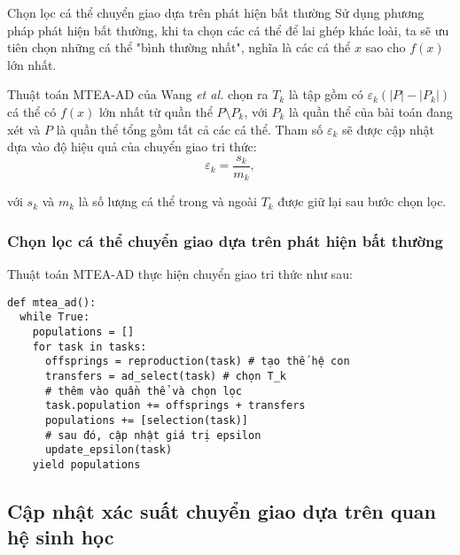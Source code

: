 \begin{frame}{Chọn lọc cá thể chuyển giao dựa trên phát hiện bất thường}
Sử dụng phương pháp phát hiện bất thường, khi ta chọn các cá thể để lai ghép
khác loài, ta sẽ ưu tiên chọn những cá thể "bình thường nhất", nghĩa là các cá
thể \( x \) sao cho \( f(x) \) lớn nhất.

Thuật toán MTEA-AD của Wang \textit{et al.} chọn ra \( T_{k} \) là tập gồm có \(
\varepsilon_{k} (|P| - |P_{k}|) \) cá thể
có \( f(x) \) lớn nhất từ quần thể \( P \setminus P_{k} \), với \( P_{k} \) là
quần thể của bài toán đang xét và \( P \) là quần thể tổng gồm tất cả các cá
thể. Tham số \( \varepsilon_{k} \) sẽ được cập nhật dựa vào độ hiệu quả của chuyển
giao tri thức:
\[
  \varepsilon_{k} = \frac{s_{k}}{m_{k}}
,\]

với \( s_{k} \) và \( m_{k} \) là số lượng cá thể trong và ngoài \( T_{k} \)
được giữ lại sau bước chọn lọc.
\end{frame}

\begin{frame}[fragile]
\frametitle{Chọn lọc cá thể chuyển giao dựa trên phát hiện bất thường}
  Thuật toán MTEA-AD thực hiện chuyển giao tri thức như sau:
\begin{verbatim}
def mtea_ad():
  while True:
    populations = []
    for task in tasks:
      offsprings = reproduction(task) # tạo thế hệ con
      transfers = ad_select(task) # chọn T_k
      # thêm vào quần thể và chọn lọc
      task.population += offsprings + transfers 
      populations += [selection(task)]
      # sau đó, cập nhật giá trị epsilon
      update_epsilon(task)
    yield populations
\end{verbatim}
\end{frame}


\subsection{Cập nhật xác suất chuyển giao dựa trên quan hệ sinh học} %
\label{sub:Cập nhật xác suất chuyển giao dựa trên quan hệ sinh học}

